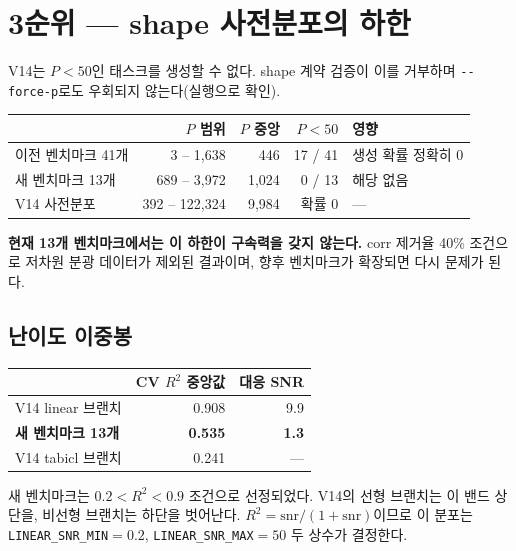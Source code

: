 \documentclass[11pt,a4paper]{article}
\theoremstyle{definition}
\begin{document}
\section{3순위 --- shape 사전분포의 하한}

V14는 \(P<50\)인 태스크를 생성할 수 없다. shape 계약 검증이 이를 거부하며 \verb|--force-p|로도 우회되지 않는다(실행으로 확인).

\begin{center}
\small
\begin{tabular}{@{}lrrrl@{}}
\toprule
& \textbf{\(P\) 범위} & \textbf{\(P\) 중앙} & \textbf{\(P<50\)} & \textbf{영향}\\
\midrule
이전 벤치마크 41개 & 3 -- 1{,}638 & 446 & \textcolor{acc}{17 / 41} & 생성 확률 정확히 0\\
\textcolor{mut}{새 벤치마크 13개} & \textcolor{mut}{689 -- 3{,}972} & \textcolor{mut}{1{,}024} & \textcolor{mut}{0 / 13} & \textcolor{mut}{해당 없음}\\
V14 사전분포 & 392 -- 122{,}324 & 9{,}984 & 확률 0 & ---\\
\bottomrule
\end{tabular}
\end{center}

\textbf{현재 13개 벤치마크에서는 이 하한이 구속력을 갖지 않는다.} corr 제거율 40\% 조건으로 저차원 분광 데이터가 제외된 결과이며, 향후 벤치마크가 확장되면 다시 문제가 된다.

\subsection{난이도 이중봉}

\begin{center}
\begin{tabular}{@{}lrr@{}}
\toprule
& \textbf{CV \(R^2\) 중앙값} & \textbf{대응 SNR}\\
\midrule
V14 linear 브랜치 & 0.908 & 9.9\\
\textbf{새 벤치마크 13개} & \textbf{0.535} & \textbf{1.3}\\
V14 tabicl 브랜치 & 0.241 & ---\\
\bottomrule
\end{tabular}
\end{center}

새 벤치마크는 \(0.2<R^2<0.9\) 조건으로 선정되었다. V14의 선형 브랜치는 이 밴드 상단을, 비선형 브랜치는 하단을 벗어난다. \(R^2=\text{snr}/(1+\text{snr})\)이므로 이 분포는 \verb|LINEAR_SNR_MIN|\(=0.2\), \verb|LINEAR_SNR_MAX|\(=50\) 두 상수가 결정한다.
\end{document}
